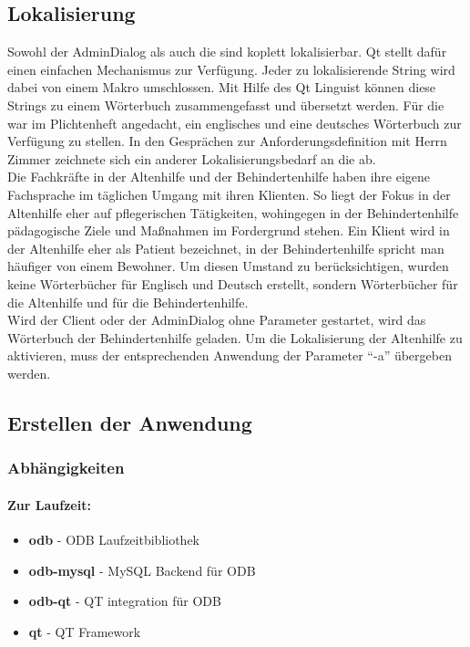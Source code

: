 \subsection{Lokalisierung}
Sowohl der AdminDialog als auch die \EBP sind koplett lokalisierbar. Qt stellt dafür einen einfachen Mechanismus zur Verfügung. Jeder zu
lokalisierende String wird dabei von einem Makro umschlossen. Mit Hilfe des Qt Linguist können diese Strings zu einem Wörterbuch zusammengefasst und
übersetzt werden. Für die \EBP war im Plichtenheft angedacht, ein englisches und eine deutsches Wörterbuch zur Verfügung zu stellen. In den
Gesprächen zur Anforderungsdefinition mit Herrn Zimmer zeichnete sich ein anderer Lokalisierungsbedarf an die \EBP ab.\\
Die Fachkräfte in der Altenhilfe und der Behindertenhilfe haben ihre eigene Fachsprache im täglichen Umgang mit ihren Klienten. So liegt der Fokus in
der Altenhilfe eher auf pflegerischen Tätigkeiten, wohingegen in der Behindertenhilfe pädagogische Ziele und Maßnahmen im Fordergrund stehen. Ein
Klient wird in der Altenhilfe eher als Patient bezeichnet, in der Behindertenhilfe spricht man häufiger von einem Bewohner. Um diesen Umstand zu
berücksichtigen, wurden keine Wörterbücher für Englisch und Deutsch erstellt, sondern Wörterbücher für die Altenhilfe und für die Behindertenhilfe.\\
Wird der Client oder der AdminDialog ohne Parameter gestartet, wird das Wörterbuch der Behindertenhilfe geladen. Um die Lokalisierung der Altenhilfe
zu aktivieren, muss der entsprechenden Anwendung der Parameter ``-a'' übergeben werden.

\newpage

\subsection{Erstellen der Anwendung}
\subsubsection{Abhängigkeiten}
\paragraph{Zur Laufzeit:}
\begin{itemize}
	\item \textbf{odb} - ODB Laufzeitbibliothek
	\item \textbf{odb-mysql} - MySQL Backend für ODB
	\item \textbf{odb-qt} - QT integration für ODB
	\item \textbf{qt} - QT Framework
\end{itemize}
